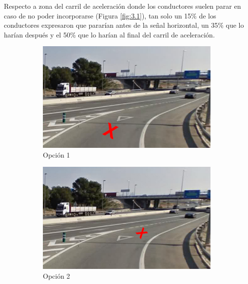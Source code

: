 Respecto a zona del carril de aceleración donde los conductores suelen parar en caso de no poder incorporarse (Figura \ref{fig:3.1}), tan solo un 15\% de los conductores expresaron que pararían antes de la señal horizontal, un 35\% que lo harían después y el 50\% que lo harían al final del carril de aceleración.  

\begin{figure}[htb]
  \centering
  \begin{subfigure}[b]{0.45\textwidth}
    \includegraphics[width=\textwidth]{figures/3.1a.jpg}
    \caption{Opción 1}
    \label{fig:3.1a}
  \end{subfigure}
  \hfill
  \begin{subfigure}[b]{0.45\textwidth}
    \includegraphics[width=\textwidth]{figures/3.1b.jpg}
    \caption{Opción 2}
    \label{fig:3.1b}
  \end{subfigure}
  \begin{subfigure}[b]{0.45\textwidth}

\end{subfigure}
\end{figure}
